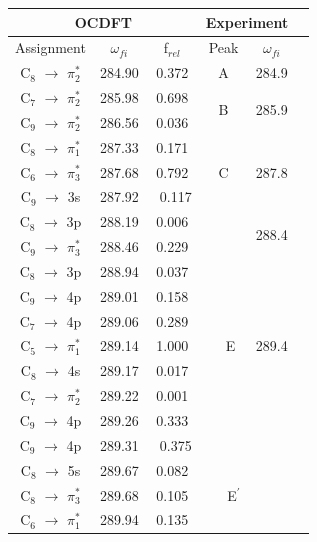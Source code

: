 \documentclass[12pt]{article}
\begin{document}
\begin{table}
 \centering
     \begin{tabular}{c@{\hskip 0.22in}c@{\hskip 0.22in}c@{\hskip 0.52in}c@{\hskip 0.22in}c@{\hskip 0.22in}c}
     \hline
     \hline
   \multicolumn{3}{c}{OCDFT} &\multicolumn{2}{c}{Experiment} \\
   \hline
   Assignment & $\omega_{fi}$ & f$_{rel}$ & Peak &  $\omega_{fi}$   \\
   \hline
 C$_8$ $\rightarrow$ $\pi^*_2$ & 284.90 & 0.372 & A & 284.9 \vspace{2mm}\\
 C$_7$ $\rightarrow$ $\pi^*_2$ & 285.98 & 0.698 &  \multirow{2}{*}{B} & \multirow{2}{*}{285.9}\\
 C$_9$ $\rightarrow$ $\pi^*_2$ & 286.56 & 0.036 \vspace{2mm}\\
 C$_8$ $\rightarrow$ $\pi^*_1$ & 287.33 & 0.171 & \multirow{3}{*}{C} & \multirow{3}{*}{287.8} \\
 C$_6$ $\rightarrow$ $\pi^*_3$& 287.68 & 0.792 \\
 C$_9$ $\rightarrow$ 3s & 287.92 & \ 0.117 
 \vspace{2mm}\\
 C$_8$ $\rightarrow$ 3p& 288.19 & 0.006 & \ \ \multirow{2}{*}{D} & \multirow{2}{*}{288.4}
 \\
 C$_9$ $\rightarrow$ $\pi^*_3$ & 288.46 & 0.229 &
 \vspace{2mm}\\
 C$_8$ $\rightarrow$ 3p & 288.94 & 0.037 &\multirow{7}{*}{\ \ E} & \multirow{7}{*}{289.4} \\
 C$_9$ $\rightarrow$ 4p & 289.01 & 0.158 \\
 C$_7$ $\rightarrow$ 4p & 289.06 & 0.289 \\
 C$_5$ $\rightarrow$ $\pi^*_1$ & 289.14 & 1.000 \\
 C$_8$ $\rightarrow$ 4s & 289.17 & 0.017 \\
 C$_7$ $\rightarrow$ $\pi^*_2$ & 289.22 & 0.001 \\
 C$_9$ $\rightarrow$ 4p & 289.26 & 0.333 \\
 C$_9$ $\rightarrow$ 4p & 289.31 & \ 0.375 
 \vspace{2mm}\\
 C$_8$ $\rightarrow$ 5s & 289.67 & 0.082& \multirow{3}{*}{\ \ \ E$^{\prime}$} \\
 C$_8$ $\rightarrow$ $\pi^*_3$ & 289.68 & 0.105 \\
 C$_6$ $\rightarrow$ $\pi^*_1$ & 289.94 & 0.135 \vspace{2mm}\\

\end{tabular}
\end{table}
\end{document}
